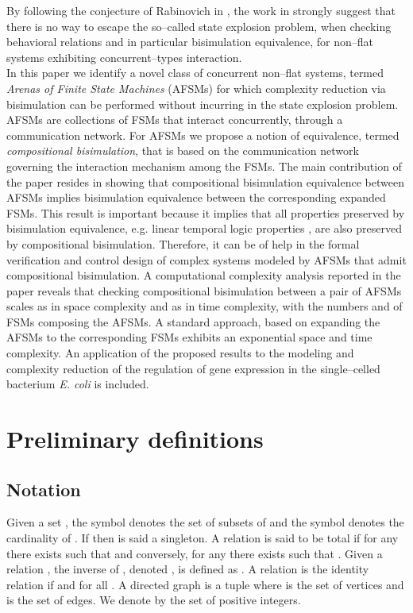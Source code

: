 \documentclass{amsart}
\theoremstyle{definition}
\theoremstyle{remark}
\numberwithin{equation}{section}
\begin{document}
By following the conjecture of Rabinovich in \cite{StateExplosion0}, the work in \cite{StateExplosion2,StateExplosion1} strongly suggest that there is no way to escape the so--called state explosion problem, when checking behavioral relations and in particular bisimulation equivalence, for non--flat systems exhibiting concurrent--types interaction. \\
In this paper we identify a novel class of concurrent non--flat systems, termed \textit{Arenas of Finite State Machines} (AFSMs) for which complexity reduction via bisimulation can be performed without incurring in the state explosion problem. AFSMs are collections of FSMs that interact concurrently, through a communication network. For AFSMs we propose a notion of equivalence, termed \textit{compositional bisimulation}, that is based on the communication network governing the interaction mechanism among the FSMs. The main contribution of the paper resides in showing that compositional bisimulation equivalence between AFSMs implies bisimulation equivalence between the corresponding expanded FSMs. 
This result is important because it implies that all properties preserved by bisimulation equivalence, e.g. linear temporal logic properties \cite{ModelChecking}, are also preserved by compositional bisimulation. Therefore, it can be of help in the formal verification and control design of complex systems modeled by AFSMs that admit compositional bisimulation. 
A computational complexity analysis reported in the paper reveals that 
checking compositional bisimulation between a pair of AFSMs scales as  in space complexity and as  in time complexity, with the numbers  and  of FSMs composing the AFSMs.  
A standard approach, based on expanding the AFSMs to the corresponding FSMs exhibits an exponential space and time complexity. 
An application of the proposed results to the modeling and complexity reduction of the regulation of gene expression in the single--celled bacterium \textit{E. coli} is included.

\section{Preliminary definitions}
\label{Sec:FSM}
\subsection{Notation}
Given a set , the symbol  denotes the set of subsets of  and the symbol  denotes the cardinality of . 
If  then  is said a singleton. 
A relation  is said to be total if for any  there exists  such that  and conversely, for any  there exists  such that . Given a relation , the inverse of , denoted , is defined as . A relation  is the identity relation if  and  for all . A directed graph is a tuple  where  is the set of vertices and  is the set of edges. We denote by  the set of positive integers. 
\end{document}
